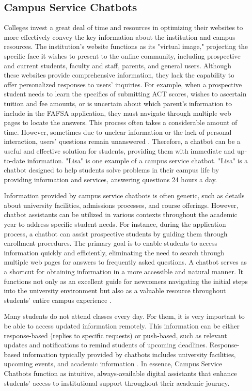 \documentclass{xum_review}
\begin{document}
\subsection{Campus Service Chatbots}
Colleges invest a great deal of time and resources in optimizing their websites
to more effectively convey the key information about the institution and campus
resources. The institution's website functions as its "virtual image,"
projecting the specific face it wishes to present to the online community,
including prospective and current students, faculty and staff, parents, and
general users. Although these websites provide comprehensive information, they
lack the capability to offer personalized responses to users' inquiries. For
example, when a prospective student needs to learn the specifics of submitting
ACT scores, wishes to ascertain tuition and fee amounts, or is uncertain about
which parent's information to include in the FAFSA application, they must
navigate through multiple web pages to locate the answers. This process often
takes a considerable amount of time. However, sometimes due to unclear
information or the lack of personal interaction, users' questions remain
unanswered \citep{neupane2024questions}. Therefore, a chatbot can be a useful and
effective solution for students, providing them with immediate and up-to-date
information. "Lisa" is one example of a campus service chatbot. "Lisa"
is a chatbot designed to help students solve problems in their campus life by
providing information and services, answering questions 24 hours a day. 

Information provided by campus service chatbots is often generic, such as details
about university facilities, admissions processes, and course offerings.
However, chatbot assistants can be utilized in various contexts throughout the
academic year to address specific student needs. For instance, during the
application process, a chatbot can assist prospective students by guiding them
through enrollment procedures. The primary goal is to enable students to access
information quickly and efficiently, eliminating the need to search through
multiple web pages for answers to frequently asked questions. A chatbot serves
as a shortcut for obtaining information in a more accessible and natural manner.
It functions not only as an excellent guide for newcomers navigating the initial
steps into the university environment but also as a valuable resource throughout
students' entire campus experience \citep{dibitonto2018chatbot}. 

Many students do not attend classes every day. For them, it is very important to
be able to access updated information remotely. This information can be either
response-based (replies to specific requests) or push-based, such as relevant
updates and notifications to remind students of upcoming deadlines.
Response-based information typically provided by chatbots includes university
facilities, upcoming events, and academic information \citep{ranoliya2017chatbot}.
In essence, Campus Service Chatbots function as intuitive, always-available
digital assistants that enhance students' access to institutional support
throughout their academic journey.
\end{document}
